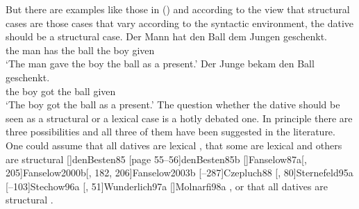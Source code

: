 But there are examples like those in () and according to the view that structural cases are
those cases that vary according to the syntactic environment, the dative should be a structural case.
\eal
\ex 
\gll Der Mann  hat   den Ball dem Jungen geschenkt.\\
     the man   has   the ball the boy given\\
\glt `The man gave the boy the ball as a present.'
\ex 
\gll Der Junge bekam den Ball geschenkt.\\
     the boy   got   the ball given\\   
\glt `The boy got the ball as a present.'
\zl
The question whether the dative should be seen as a structural or a lexical case is a hotly debated
one. In principle there are three possibilities and all three of them have been suggested in the
literature. One could assume that all datives are lexical 
\parencites{Haider85b}%
[]{Haider86}[, 217, 228]{HM94a}%
{Mueller99a,Mueller2001a}[]{Mueller2003e}%
[]{Scherpenisse86a}%
[, 291]{Pollard94a}%
[]{Meurers99b}[]{VS98a}[]{Abraham95a-u}%
[]{McIntyre2006a}, 
that some are lexical and others are structural 
\parencites
{Wegener85a}%
{Wegener90}%
[]{denBesten85}%
[page 55--56]{denBesten85b}%
[]{Fanselow87a}[, 205]{Fanselow2000b}[, 182, 206]{Fanselow2003b}%
[--287]{Czepluch88}%
[, 80]{Sternefeld95a}%
[--103]{Stechow96a}%
[, 51]{Wunderlich97a}%
[]{Molnarfi98a}%
, or that all datives are structural 
\parencites[]{Sternefeld95a}%
[, 205--206]{Ryu97a}%
[--97]{Gunkel2003b}.%

